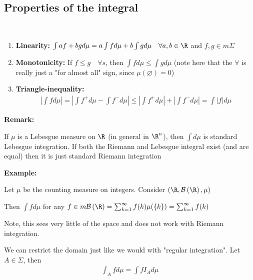 \subsection{Properties of the integral}\hfill\\
\begin{enumerate}[leftmargin=*]
  \item\textbf{Linearity:} $\int af+bg d\mu = a\int f d\mu+b\int g d\mu\quad \forall a,b\in \R$ and $f,g\in m\Sigma$
    \par\bigskip
  \item\textbf{Monotonicity:} If $f\leq g\quad\forall s$, then $\int f d\mu\leq \int g d\mu$ (note here that the $\forall$ is really just a "for almost all" sign, since $\mu(\varnothing)=0$)
    \par\bigskip
  \item\textbf{Triangle-inequality:}
    \begin{equation*}
      \begin{gathered}
        \left|\int f d\mu\right| = \left|\int f^+ d\mu-\int f^- d\mu\right|\leq\left|\int f^+ d\mu\right|+\left|\int f^- d\mu\right| = \int\left|f\right|d\mu
      \end{gathered}
    \end{equation*}
\end{enumerate}
\par\bigskip
\noindent\textbf{Remark:}\par
\noindent If $\mu$ is a Lebesgue measure on $\R$ (in general in $\R^n$), then $\int d\mu$ is standard Lebesgue integration. If both the Riemann and Lebesgue integral exist (and are equal) then it is just standard Riemann integration
\par\bigskip
\noindent\textbf{Example:}\par
\noindent Let $\mu$ be the counting measure on integers. Consider $(\R,\mathcal{B}\left(\R\right),\mu)$\par
\noindent Then $\int f d\mu$ for any $f\in m\mathcal{B}\left(\R\right) = \sum_{k=1}^{\infty}f(k)\mu(\left\{k\right\}) = \sum_{k=1}^{\infty}f(k)$\par
\noindent Note, this sees very little of the space and does not work with Riemann integration.
\par\bigskip
\noindent We can restrict the domain just like we would with "regular integration". Let $A\in\Sigma$, then
\begin{equation*}
  \begin{gathered}
    \int_A fd\mu = \int fI_{A}d\mu
  \end{gathered}
\end{equation*}
